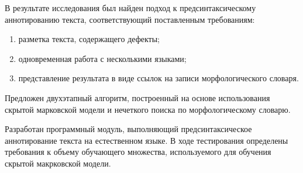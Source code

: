 В результате исследования был найден подход к предсинтаксическому аннотированию текста, соответствующий поставленным требованиям:
\begin{enumerate}
	\item 
	разметка текста, содержащего дефекты;
	\item
	одновременная работа с несколькими языками;
	\item
	представление результата в виде ссылок на записи морфологического словаря.
\end{enumerate}

Предложен двухэтапный алгоритм, построенный на основе использования скрытой марковской модели и нечеткого поиска по морфологическому словарю.

Разработан программный модуль, выполняющий предсинтаксическое аннотирование текста на естественном языке. В ходе тестирования определены требования к объему обучающего множества, используемого для обучения скрытой макрковской модели.